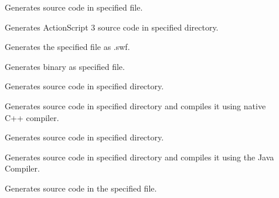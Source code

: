 \begin{description}
	\item[] Generates  source code in specified file.
	\item[] Generates ActionScript 3 source code in specified directory.
	\item[] Generates the specified file as  .swf.
	\item[] Generates  binary as specified file.
	\item[] Generates  source code in specified directory.
	\item[] Generates  source code in specified directory and compiles it using native C++ compiler.
	\item[] Generates  source code in specified directory.
	\item[] Generates  source code in specified directory and compiles it using the Java Compiler.
	\item[] Generates  source code in the specified file.
\end{description}

